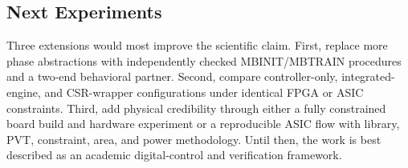 \subsection{Next Experiments}

Three extensions would most improve the scientific claim. First, replace more
phase abstractions with independently checked MBINIT/MBTRAIN procedures and a
two-end behavioral partner. Second, compare controller-only, integrated-engine,
and CSR-wrapper configurations under identical FPGA or ASIC constraints.
Third, add physical credibility through either a fully constrained board build
and hardware experiment or a reproducible ASIC flow with library, PVT,
constraint, area, and power methodology. Until then, the work is best described
as an academic digital-control and verification framework.
